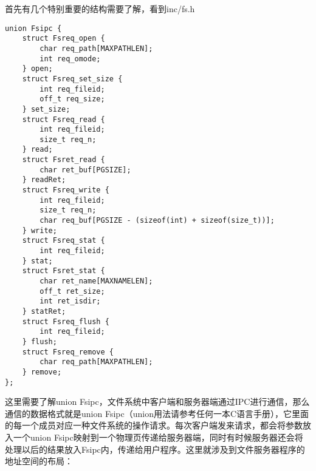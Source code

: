 \documentclass{article}
\begin{document}
\begin{CJK*}{UTF8}{gkai}
首先有几个特别重要的结构需要了解，看到inc/fs.h

\begin{lstlisting}[style=ccode, firstnumber=76, title={\scriptsize \ttfamily \bfseries inc/fs.h}]
union Fsipc {
	struct Fsreq_open {
		char req_path[MAXPATHLEN];
		int req_omode;
	} open;
	struct Fsreq_set_size {
		int req_fileid;
		off_t req_size;
	} set_size;
	struct Fsreq_read {
		int req_fileid;
		size_t req_n;
	} read;
	struct Fsret_read {
		char ret_buf[PGSIZE];
	} readRet;
	struct Fsreq_write {
		int req_fileid;
		size_t req_n;
		char req_buf[PGSIZE - (sizeof(int) + sizeof(size_t))];
	} write;
	struct Fsreq_stat {
		int req_fileid;
	} stat;
	struct Fsret_stat {
		char ret_name[MAXNAMELEN];
		off_t ret_size;
		int ret_isdir;
	} statRet;
	struct Fsreq_flush {
		int req_fileid;
	} flush;
	struct Fsreq_remove {
		char req_path[MAXPATHLEN];
	} remove;
};
\end{lstlisting}

这里需要了解union Fsipc，文件系统中客户端和服务器端通过IPC进行通信，那么通信的数据格式就是union Fsipc（union用法请参考任何一本C语言手册），它里面的每一个成员对应一种文件系统的操作请求。每次客户端发来请求，都会将参数放入一个union Fsipc映射到一个物理页传递给服务器端，同时有时候服务器还会将处理以后的结果放入Fsipc内，传递给用户程序。这里就涉及到文件服务器程序的地址空间的布局：


\end{CJK*}
\end{document}
